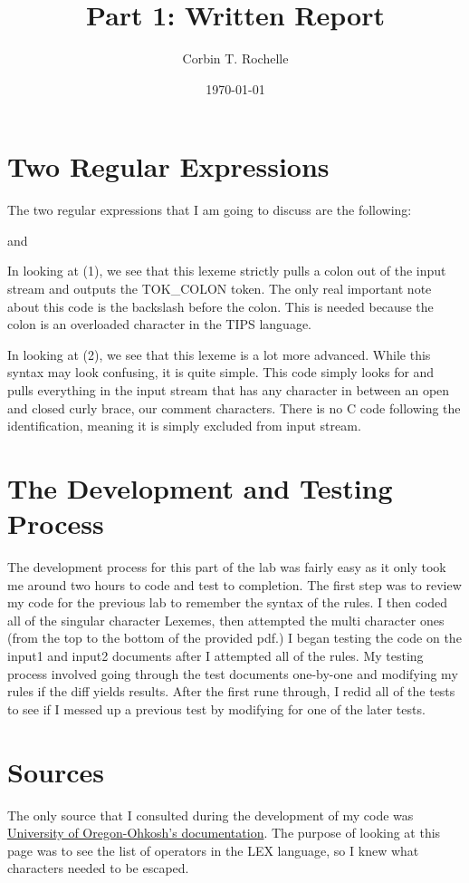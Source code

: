 \documentclass{article}
\author{Corbin T. Rochelle}
\date{\today}
\title{Part 1: Written Report}
\begin{document}
\maketitle

\section{Two Regular Expressions}
The two regular expressions that I am going to discuss are the following:

and 

In looking at (1), we see that this lexeme strictly pulls a colon out of the input stream and outputs the TOK\_COLON token. 
The only real important note about this code is the backslash before the colon.
This is needed because the colon is an overloaded character in the TIPS language. 

In looking at (2), we see that this lexeme is a lot more advanced.
While this syntax may look confusing, it is quite simple. 
This code simply looks for and pulls everything in the input stream that has any character in between an open and closed curly brace, our comment characters.
There is no C code following the identification, meaning it is simply excluded from input stream.

\section{The Development and Testing Process}
The development process for this part of the lab was fairly easy as it only took me around two hours to code and test to completion. 
The first step was to review my code for the previous lab to remember the syntax of the rules.
I then coded all of the singular character Lexemes, then attempted the multi character ones (from the top to the bottom of the provided pdf.) 
I began testing the code on the input1 and input2 documents after I attempted all of the rules. 
My testing process involved going through the test documents one-by-one and modifying my rules if the diff yields results. 
After the first rune through, I redid all of the tests to see if I messed up a previous test by modifying for one of the later tests. 

\section{Sources}
The only source that I consulted during the development of my code was \href{https://www.csd.uwo.ca/~mmorenom/CS447/Lectures/Lexical.html/node11.html}{University of Oregon-Ohkosh's documentation}. 
The purpose of looking at this page was to see the list of operators in the LEX language, so I knew what characters needed to be escaped. 
\end{document}
